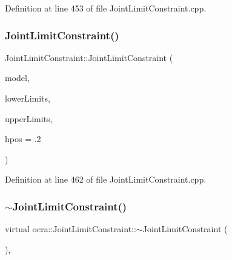 Definition at line 453 of file Joint\+Limit\+Constraint.\+cpp.

\hypertarget{classocra_1_1JointLimitConstraint_a8e767f982c1d41192b03a0aafbd3ced5}{}\label{classocra_1_1JointLimitConstraint_a8e767f982c1d41192b03a0aafbd3ced5} 
\subsubsection{\texorpdfstring{Joint\+Limit\+Constraint()}{JointLimitConstraint()}\hspace{0.1cm}{\footnotesize\ttfamily [2/2]}}
{\footnotesize\ttfamily Joint\+Limit\+Constraint\+::\+Joint\+Limit\+Constraint (\begin{DoxyParamCaption}\item[{const \hyperlink{classocra_1_1Model}{Model} \&}]{model,  }\item[{const Eigen\+::\+Vector\+Xd \&}]{lower\+Limits,  }\item[{const Eigen\+::\+Vector\+Xd \&}]{upper\+Limits,  }\item[{double}]{hpos = {\ttfamily .2} }\end{DoxyParamCaption})}



Definition at line 462 of file Joint\+Limit\+Constraint.\+cpp.

\hypertarget{classocra_1_1JointLimitConstraint_a5cb58e4dd8fe8c313a50e8601306e0dd}{}\label{classocra_1_1JointLimitConstraint_a5cb58e4dd8fe8c313a50e8601306e0dd} 
\subsubsection{\texorpdfstring{$\sim$\+Joint\+Limit\+Constraint()}{~JointLimitConstraint()}}
{\footnotesize\ttfamily virtual ocra\+::\+Joint\+Limit\+Constraint\+::$\sim$\+Joint\+Limit\+Constraint (\begin{DoxyParamCaption}{ }\end{DoxyParamCaption})\hspace{0.3cm}{\ttfamily [inline]}, {\ttfamily [virtual]}}



